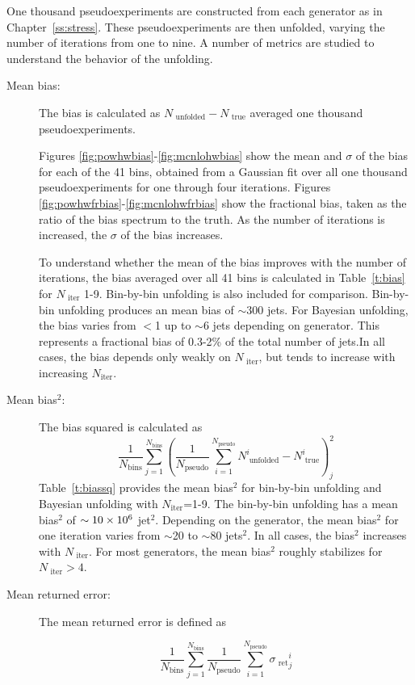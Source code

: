 One thousand pseudoexperiments are constructed from each generator as in Chapter~\ref{ss:stress}. These pseudoexperiments are then unfolded, varying the number of iterations from one to nine. A number of metrics are studied to understand the behavior of the unfolding.
\begin{description}
\item[Mean bias:] The bias is calculated as $N_{\textrm{ unfolded}}-N_{\textrm{ true}}$ averaged one thousand pseudoexperiments.

Figures \ref{fig:powhwbias}-\ref{fig:mcnlohwbias} show the mean and $\sigma$ of the bias for each of the 41 bins, obtained from a Gaussian fit over all one thousand pseudoexperiments for one through four iterations. Figures \ref{fig:powhwfrbias}-\ref{fig:mcnlohwfrbias} show the fractional bias, taken as the ratio of the bias spectrum to the truth. As the number of iterations is increased, the $\sigma$ of the bias increases. 

To understand whether the mean of the bias improves with the number of iterations, the bias averaged over all 41 bins is calculated in Table~\ref{t:bias} for $N_{\textrm{ iter}}$ 1-9. Bin-by-bin unfolding is also included for comparison. Bin-by-bin unfolding produces an mean bias of $\sim$300 jets. For Bayesian unfolding, the bias varies from $<$1 up to $\sim$6 jets depending on generator. This represents a fractional bias of 0.3-2\% of the total number of jets.In all cases, the bias depends only weakly on $N_{\textrm{ iter}}$, but tends to increase with increasing $N_{\textrm{iter}}$.
\item[Mean bias$^2$:]The bias squared is calculated as
$$
\frac{1}{N_{\textrm{bins}}} \sum_{j=1}^{N_{\textrm{bins}}} \left (\frac{1}{N_{\textrm{pseudo}}} \sum_{i=1}^{N_{\textrm{pseudo}}} N^i_{\textrm{ unfolded}}-N^{i}_{\textrm{ true}} \right )_{j}^{2}
$$
Table~\ref{t:biassq} provides the mean bias$^{2}$ for bin-by-bin unfolding and Bayesian unfolding with $N_{\textrm{iter}}$=1-9. The bin-by-bin unfolding has a mean bias$^2$ of $\sim 10\times 10^{6}$ jet$^2$. Depending on the generator, the mean bias$^2$ for one iteration varies from $\sim$20 to $\sim$80 jets$^2$.  In all cases, the bias$^2$ increases with $N_{\textrm{ iter}}$. For most generators, the mean bias$^2$ roughly stabilizes for $N_{\textrm{ iter}} > 4$. 
\item[Mean \textrm{ret}urned error:] The mean \textrm{ ret}urned error is defined as

$$
\frac{1}{N_{\textrm{bins}}} \sum_{j=1}^{N_{\textrm{bins}}} \frac{1}{N_{\textrm{pseudo}}} \sum_{i=1}^{N_{\textrm{pseudo}}} {\sigma_{\textrm{ ret}}}^{i}_{j}
$$  


\end{description}
